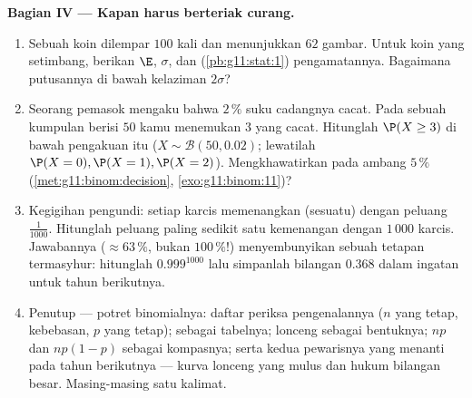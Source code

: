 \begin{problem}
\medskip
\noindent\textbf{Bagian IV --- Kapan harus berteriak curang.}
\begin{enumerate}[resume]
  \item Sebuah koin dilempar $100$ kali dan menunjukkan $62$ gambar. Untuk
        koin yang setimbang, berikan $\E$, $\sigma$, dan 
        (\cref{pb:g11:stat:1}) pengamatannya. Bagaimana putusannya
        di bawah kelaziman $2\sigma$?
  \item Seorang pemasok mengaku bahwa $2\,\%$ suku cadangnya cacat. Pada
        sebuah kumpulan berisi $50$ kamu menemukan $3$ yang cacat. Hitunglah
        $\P(X \geq 3)$ di bawah pengakuan itu
        ($X \sim \mathcal B(50, 0.02)$; lewatilah
        $\P(X = 0), \P(X = 1), \P(X = 2)$). Mengkhawatirkan pada
        ambang $5\,\%$ (\cref{met:g11:binom:decision},
        \cref{exo:g11:binom:11})?
  \item Kegigihan pengundi: setiap karcis memenangkan (sesuatu) dengan
        peluang $\frac{1}{1000}$. Hitunglah peluang
        paling sedikit satu kemenangan dengan $1\,000$ karcis. Jawabannya
        ($\approx 63\,\%$, bukan $100\,\%$!) menyembunyikan sebuah tetapan
        termasyhur: hitunglah $0.999^{1000}$ lalu simpanlah bilangan
        $0.368$ dalam ingatan untuk tahun berikutnya.
  \item Penutup --- potret binomialnya: daftar periksa pengenalannya
        ($n$ yang tetap, kebebasan, $p$ yang tetap);
         sebagai tabelnya; lonceng sebagai bentuknya;
        $np$ dan $np(1-p)$ sebagai kompasnya; serta kedua pewarisnya yang
        menanti pada tahun berikutnya --- kurva lonceng yang mulus dan
        hukum bilangan besar. Masing-masing satu kalimat.

\end{enumerate}
\end{problem}
